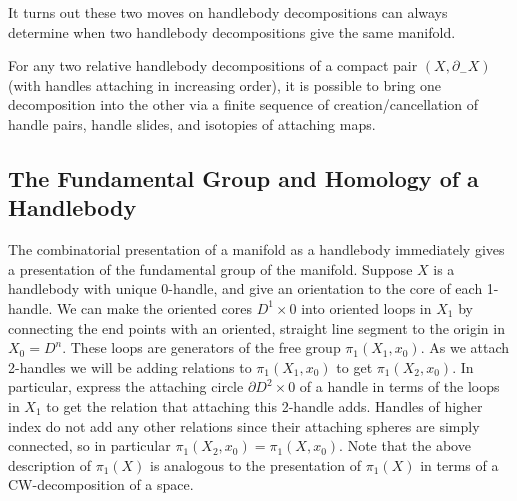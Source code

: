 It turns out these two moves on handlebody decompositions can always determine when two handlebody decompositions give the same manifold.

\begin{prop}
For any two relative handlebody decompositions of a compact pair $(X,\partial_- X)$ (with handles attaching in increasing order), it is possible to bring one decomposition into the other via a finite sequence of creation/cancellation of handle pairs, handle slides, and isotopies of attaching maps.
\end{prop}



\subsection{The Fundamental Group and Homology of a Handlebody}
\label{The Fundamental Group and Homology of a Handlebody}


The combinatorial presentation of a manifold as a handlebody immediately gives a presentation of the fundamental group of the manifold. Suppose $X$ is a handlebody with unique 0-handle, and give an orientation to the core of each 1-handle. We can make the oriented cores $D^1 \times 0$ into oriented loops in $X_1$ by connecting the end points with an oriented, straight line segment to the origin in $X_0 = D^n$. These loops are generators of the free group $\pi_1(X_1,x_0)$. As we attach 2-handles we will be adding relations to $\pi_1(X_1,x_0)$ to get $\pi_1(X_2,x_0)$. In particular, express the attaching circle $\partial D^2 \times 0$ of a handle in terms of the loops in $X_1$ to get the relation that attaching this 2-handle adds. Handles of higher index do not add any other relations since their attaching spheres are simply connected, so in particular $\pi_1(X_2,x_0) = \pi_1(X,x_0)$. Note that the above description of $\pi_1(X)$ is analogous to the presentation of $\pi_1(X)$ in terms of a CW-decomposition of a space. 

